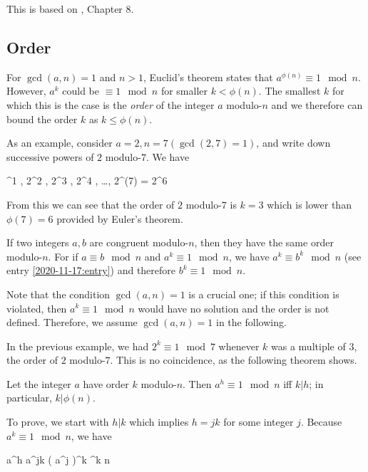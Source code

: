 
This is based on \cite{Burton2011}, Chapter 8.

\subsection{Order}

For $\gcd(a,n)=1$ and $n > 1$, Euclid's theorem states that $a^{\phi(n)} \equiv 1 \mod n$. However, $a^k$ could be $\equiv 1 \mod n$ for smaller $k < \phi(n)$. The smallest $k$ for which this is the case is the \emph{order} of the integer $a$ modulo-$n$ and we therefore can bound the order $k$ as $k \leq \phi(n)$.

As an example, consider $a = 2, n = 7 (\gcd(2,7)=1)$, and write down successive powers of $2$ modulo-$7$. We have

^1  , 2^2  , 2^3  , 2^4  , \ldots, 2^{\phi(7)} = 2^6  
\eee

From this we can see that the order of $2$ modulo-$7$ is $k=3$ which is lower than $\phi(7) = 6$ provided by Euler's theorem.

If two integers $a, b$ are congruent modulo-$n$, then they have the same order modulo-$n$. For if $a \equiv b \mod n$ and $a^k \equiv 1 \mod n$, we have $a^k \equiv b^k \mod n$ (see entry \ref{2020-11-17:entry}) and therefore $b^k \equiv 1 \mod n$.

Note that the condition $\gcd(a,n)=1$ is a crucial one; if this condition is violated, then $a^k \equiv 1 \mod n$ would have no solution and the order is not defined. Therefore, we assume $\gcd(a,n)=1$ in the following.

In the previous example, we had $2^k \equiv 1 \mod 7$ whenever $k$ was a multiple of $3$, the order of $2$ modulo-$7$. This is no coincidence, as the following theorem shows.

\begin{theorem} \label{2021-03-02:th0}
  Let the integer $a$ have order $k$ modulo-$n$. Then $a^h \equiv 1 \mod n$ iff $k | h$; in particular, $k | \phi(n)$.
\end{theorem}

To prove, we start with $h | k$ which implies $h = jk$ for some integer $j$. Because $a^k \equiv 1 \mod n$, we have

\bee
a^h \equiv a^{jk} \equiv \left( a^j \right)^k ^k  \mod n
\eee

